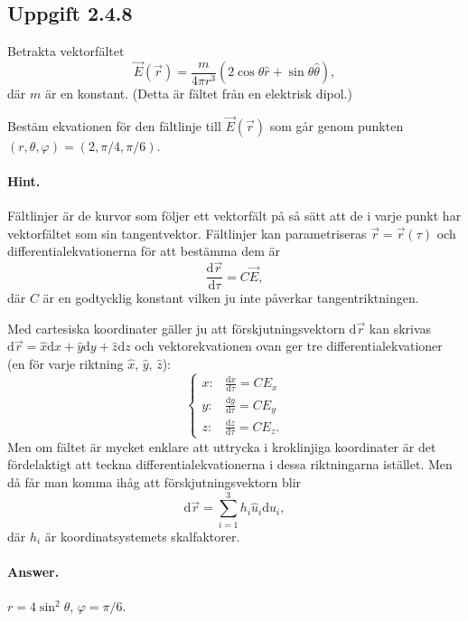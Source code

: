 \documentclass[%
oneside,                 %
final,                   %
10pt]{article}
\newenvironment{doconceexercise}{}{}
\newcounter{doconceexercisecounter}
\begin{document}
\begin{doconceexercise}

\subsection*{Uppgift 2.4.8}

Betrakta vektorfältet
$$
\vec E(\vec{r}) = \frac{m}{4\pi r^3} (2\cos \theta \hat{r} + \sin\theta \hat{\theta}),
$$
där $m$ är en konstant. (Detta är fältet från en elektrisk dipol.)

Bestäm ekvationen för den fältlinje till $\vec E(\vec{r})$ som går genom punkten $(r, \theta, \varphi) = (2, \pi /4, \pi /6)$.


\paragraph{Hint.}
Fältlinjer är de kurvor som följer ett vektorfält på så sätt att de i varje punkt har vektorfältet som sin tangentvektor. Fältlinjer kan parametriseras $\vec{r} = \vec{r}(\tau)$ och differentialekvationerna för att bestämma dem är
$$
\frac{\mbox{d}\vec{r}}{\mbox{d}\tau} = C \vec{E},
$$
där $C$ är en godtycklig konstant vilken ju inte påverkar tangentriktningen.

Med cartesiska koordinater gäller ju att förskjutningsvektorn $\mbox{d}\vec{r}$ kan skrivas $\mbox{d}\vec{r} = \hat{x} \mbox{d}x + \hat{y} \mbox{d}y + \hat{z} \mbox{d}z$ och vektorekvationen ovan ger tre differentialekvationer (en för varje riktning $\hat{x}$, $\hat{y}$, $\hat{z}$):
$$
\left\{
\begin{array}{ll}
x: &
\frac{\mbox{d}x}{\mbox{d}\tau} = C E_x \\
y: &
\frac{\mbox{d}y}{\mbox{d}\tau} = C E_y \\
z: &
\frac{\mbox{d}z}{\mbox{d}\tau} = C E_z.
\end{array}
\right.
$$
Men om fältet är mycket enklare att uttrycka i kroklinjiga koordinater är det fördelaktigt att teckna differentialekvationerna i dessa riktningarna istället. Men då får man komma ihåg att förskjutningsvektorn blir
$$
\mbox{d}\vec{r} = \sum_{i=1}^3 h_i \hat{u}_i \mbox{d}u_i,
$$
där $h_i$ är koordinatsystemets skalfaktorer.



\paragraph{Answer.}
$r = 4 \sin^2 \theta$, $\varphi = \pi/6$.


\end{doconceexercise}
\end{document}
